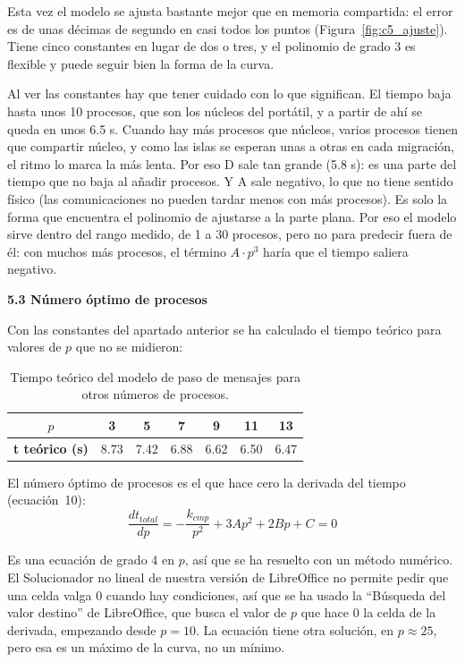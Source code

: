 \documentclass[12pt]{article}
\begin{document}
\begin{enumerate}
Esta vez el modelo se ajusta bastante mejor que en memoria compartida: el error es de unas décimas de segundo en casi todos los puntos (Figura~\ref{fig:c5_ajuste}). Tiene cinco constantes en lugar de dos o tres, y el polinomio de grado 3 es flexible y puede seguir bien la forma de la curva.

Al ver las constantes hay que tener cuidado con lo que significan. El tiempo baja hasta unos 10 procesos, que son los núcleos del portátil, y a partir de ahí se queda en unos 6.5 s. Cuando hay más procesos que núcleos, varios procesos tienen que compartir núcleo, y como las islas se esperan unas a otras en cada migración, el ritmo lo marca la más lenta. Por eso D sale tan grande (5.8 s): es una parte del tiempo que no baja al añadir procesos. Y A sale negativo, lo que no tiene sentido físico (las comunicaciones no pueden tardar menos con más procesos). Es solo la forma que encuentra el polinomio de ajustarse a la parte plana. Por eso el modelo sirve dentro del rango medido, de 1 a 30 procesos, pero no para predecir fuera de él: con muchos más procesos, el término $A \cdot p^3$ haría que el tiempo saliera negativo.

\medskip
\noindent\textbf{5.3 Número óptimo de procesos}\par
\smallskip

Con las constantes del apartado anterior se ha calculado el tiempo teórico para valores de $p$ que no se midieron:

\begin{table}[htbp]
\centering
\begin{tabular}{c|cccccc}
\toprule
\textbf{$p$} & 3 & 5 & 7 & 9 & 11 & 13 \\
\midrule
\textbf{t teórico (s)} & 8.73 & 7.42 & 6.88 & 6.62 & 6.50 & 6.47 \\
\bottomrule
\end{tabular}
\caption{Tiempo teórico del modelo de paso de mensajes para otros números de procesos.}
\label{tab:c5_teorico}
\end{table}

El número óptimo de procesos es el que hace cero la derivada del tiempo (ecuación~10):
\[
\frac{dt_{total}}{dp} = -\frac{k_{cmp}}{p^2} + 3 A p^2 + 2 B p + C = 0
\]

Es una ecuación de grado 4 en $p$, así que se ha resuelto con un método numérico. El Solucionador no lineal de nuestra versión de LibreOffice no permite pedir que una celda valga 0 cuando hay condiciones, así que se ha usado la ``Búsqueda del valor destino'' de LibreOffice, que busca el valor de $p$ que hace 0 la celda de la derivada, empezando desde $p = 10$. La ecuación tiene otra solución, en $p \approx 25$, pero esa es un máximo de la curva, no un mínimo.


\end{enumerate}
\end{document}
